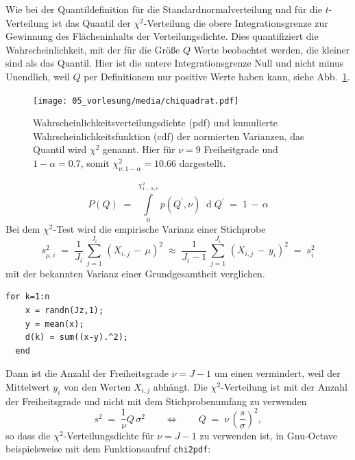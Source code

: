 Wie bei der Quantildefinition für die Standardnormalverteilung und für die $t$-Verteilung
ist das Quantil der $\chi^2$-Verteilung die obere Integrationsgrenze
zur Gewinnung des Flächeninhalts der Verteilungsdichte. Dies quantifiziert die Wahrscheinlichkeit,
mit der für die Größe $Q$ Werte beobachtet werden, die kleiner sind als das Quantil.
Hier ist die untere Integrationsgrenze Null und nicht minus Unendlich, weil $Q$ per
Definitionem nur positive Werte haben kann, siehe Abb.~\ref{chi2quantil}.
\begin{figure}
\begin{center}
\texttt{[image: 05\_vorlesung/media/chiquadrat.pdf]}
\caption{\label{chi2quantil}Wahrscheinlichkeitsverteilungsdichte (pdf) und
kumulierte Wahrscheinlichkeitsfunktion (cdf)
der normierten Varianzen, das Quantil wird $\chi^2$ genannt. Hier für
$\nu = 9$ Freiheitgrade und $1 - \alpha = 0.7$, somit $\chi^2_{\nu, 1-\alpha} = 10.66$
dargestellt.}
\end{center}
\end{figure}
\begin{equation}
P(Q) \; = \;
\int \limits_0^{\chi^2_{1-\alpha, \nu}}
p(Q^\prime, \nu) \; \operatorname{d} Q^\prime \; = \;
1 \, - \, \alpha
\label{chiQuadratQuantil}
\end{equation}
Bei dem $\chi^2$-Test wird die empirische Varianz einer Stichprobe
\begin{equation}
s_{\mu,i}^2 \; = \; \frac{1}{J_i} \, \sum_{j=1}^{J_i} \, (X_{i,j} \, - \, \mu)^2
\; \approx \; \frac{1}{J_i-1} \, \sum_{j=1}^{J_i} \, (X_{i,j} \, - \, y_i)^2
\; = \; s_i^2
\end{equation}
mit der bekannten Varianz einer Grundgesamtheit verglichen.
\begin{lstlisting}[style=Matlab]
  for k=1:n
    x = randn(Jz,1);
    y = mean(x);
    d(k) = sum((x-y).^2);
  end
\end{lstlisting}
Dann ist die Anzahl der Freiheitsgrade $\nu = J-1$ um einen vermindert,
weil der Mittelwert $y_i$ von den Werten $X_{i,j}$ abhängt. Die $\chi^2$-Verteilung
ist mit der Anzahl der Freiheitsgrade und nicht mit dem Stichprobenumfang zu verwenden
\begin{equation}
s^2 \; = \; \frac{1}{\nu} Q \, \sigma^2  \qquad \Leftrightarrow \qquad
Q \; = \; \nu \, \left( \frac{s}{\sigma} \right)^2 ,
\label{s2Qempir}
\end{equation}
so dass die $\chi^2$-Verteilungsdichte  für $\nu = J-1$ zu verwenden ist,
in Gnu-Octave beispielsweise mit dem Funktionsaufruf
\texttt{chi2pdf}:

